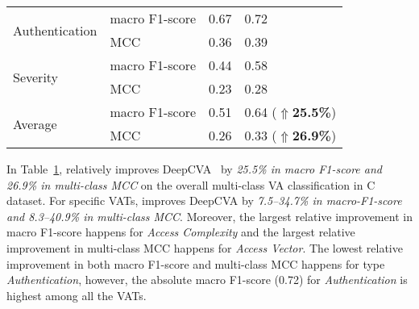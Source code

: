 \begin{table}[t]
\begin{center}
\begin{tabular}{l|p{1.9cm}<{\centering}|p{1.5cm}<{\centering}|p{1.5cm}<{\centering}}
			\hline
			\multirow{2}{*}{Authentication}  & macro F1-score                             &   0.67         & 0.72\\
			\cline{2-4}
			                                 & MCC                                 &   0.36         & 0.39\\
			\hline
			\multirow{2}{*}{Severity}        & macro F1-score                             &   0.44         & 0.58\\
			\cline{2-4}
			                                 & MCC                                 &   0.23         & 0.28\\
			\hline
			\hline
			\multirow{2}{*}{Average}         & macro F1-score                             &    0.51        & 0.64 ($\Uparrow${\bf 25.5\%})\\
			\cline{2-4}
			                                 & MCC                                 & 0.26           & 0.33 ($\Uparrow${\bf 26.9\%})\\
            \hline
		\end{tabular}
		\label{rq1_results}
	\end{center}
\end{table}

In Table~\ref{rq1_results}, {\tool} relatively improves
DeepCVA~\cite{deepCVA-ase21} by {\em 25.5\% in macro F1-score and
26.9\% in multi-class MCC} on the overall multi-class VA
classification in C dataset. For specific VATs, {\tool} improves
DeepCVA by {\em 7.5--34.7\% in macro-F1-score and 8.3--40.9\% in
multi-class MCC}. Moreover, the largest relative improvement in macro
F1-score happens for {\em Access Complexity} and the largest relative
improvement in multi-class MCC happens for {\em Access Vector}. The
lowest relative improvement in both macro F1-score and multi-class MCC
happens for type {\em Authentication}, however, the absolute macro
F1-score (0.72) for {\em Authentication} is highest among all the
VATs.




